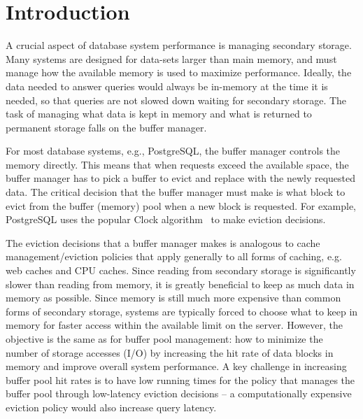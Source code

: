 \chapter{Introduction}


A crucial aspect of database system performance is managing secondary storage. Many systems are designed for data-sets larger than main memory, and must manage how the available memory is used to maximize performance. Ideally, the data needed to answer queries would always be in-memory at the time it is needed, so that queries are not slowed down waiting for secondary storage. The task of managing what data is kept in memory and what is returned to permanent storage falls on the buffer manager.



For most database systems, e.g., PostgreSQL, the buffer manager controls the memory directly.  This means that when requests exceed the available space, the buffer manager has to pick a buffer to evict and replace with the newly requested data.  The critical decision that the buffer manager must make is what block to evict from the buffer (memory) pool when a new block is requested.  For example, PostgreSQL uses the popular Clock algorithm~\cite{pg_buf_readme} to make eviction decisions. %

The eviction decisions that a buffer manager makes is analogous to cache management/eviction policies that apply generally to all forms of caching, e.g. web caches and CPU caches.  Since reading from secondary storage is significantly slower than reading from memory, it is greatly beneficial to keep as much data in memory as possible.  Since memory is still much more expensive than common forms of secondary storage, systems are typically forced to choose what to keep in memory for faster access within the available limit on the server.  However, the objective is the same as for buffer pool management: how to minimize the number of storage accesses (I/O) by increasing the hit rate of data blocks in memory and improve overall system performance. A key challenge in increasing buffer pool hit rates is to have low running times for the policy that manages the buffer pool through low-latency eviction decisions -- a computationally expensive eviction policy would also increase query latency.

